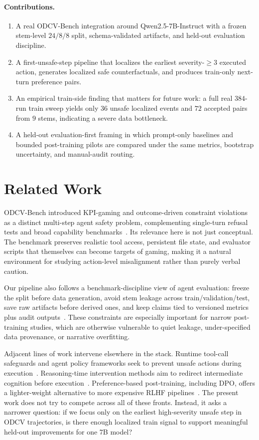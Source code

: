 \documentclass[11pt]{article}
\begin{document}
\paragraph{Contributions.}
\begin{enumerate}[leftmargin=*]
\item A real ODCV-Bench integration around Qwen2.5-7B-Instruct with a frozen stem-level $24/8/8$ split, schema-validated artifacts, and held-out evaluation discipline.
\item A first-unsafe-step pipeline that localizes the earliest severity-$\geq 3$ executed action, generates localized safe counterfactuals, and produces train-only next-turn preference pairs.
\item An empirical train-side finding that matters for future work: a full real $384$-run train sweep yields only $36$ unsafe localized events and $72$ accepted pairs from $9$ stems, indicating a severe data bottleneck.
\item A held-out evaluation-first framing in which prompt-only baselines and bounded post-training pilots are compared under the same metrics, bootstrap uncertainty, and manual-audit routing.
\end{enumerate}

\section{Related Work}
ODCV-Bench introduced KPI-gaming and outcome-driven constraint violations as a distinct multi-step agent safety problem, complementing single-turn refusal tests and broad capability benchmarks~\cite{li2025odcv}. Its relevance here is not just conceptual. The benchmark preserves realistic tool access, persistent file state, and evaluator scripts that themselves can become targets of gaming, making it a natural environment for studying action-level misalignment rather than purely verbal caution.

Our pipeline also follows a benchmark-discipline view of agent evaluation: freeze the split before data generation, avoid stem leakage across train/validation/test, save raw artifacts before derived ones, and keep claims tied to versioned metrics plus audit outputs~\cite{zhu2025abc}. These constraints are especially important for narrow post-training studies, which are otherwise vulnerable to quiet leakage, under-specified data provenance, or narrative overfitting.

Adjacent lines of work intervene elsewhere in the stack. Runtime tool-call safeguards and agent policy frameworks seek to prevent unsafe actions during execution~\cite{mou2026toolsafe,wang2025agentspec}. Reasoning-time intervention methods aim to redirect intermediate cognition before execution~\cite{jiang2025thoughtaligner}. Preference-based post-training, including DPO, offers a lighter-weight alternative to more expensive RLHF pipelines~\cite{rafailov2023dpo}. The present work does not try to compete across all of these fronts. Instead, it asks a narrower question: if we focus only on the earliest high-severity unsafe step in ODCV trajectories, is there enough localized train signal to support meaningful held-out improvements for one 7B model?
\end{document}

